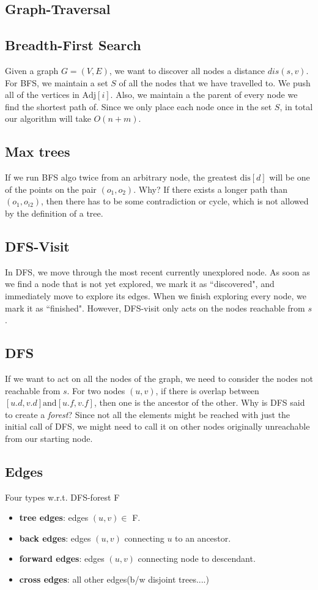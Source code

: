 \documentclass[landscape,4pt,a4paper]{article}
\begin{document}
	\raggedright
	\begin{multicols*}{5}
		\section{Graph-Traversal}
			\subsection{Breadth-First Search}
				Given a graph $G=(V,E)$, we want to discover all nodes a distance $dis(s,v)$.
				For BFS, we maintain a set $S$ of all the nodes that we have travelled to. 
				We push all of the vertices in $\text{Adj}[i]$. Also, we maintain a the parent of 
				every node we find the shortest path of. Since we only place each node once in the set $S$,
				in total our algorithm will take $O(n+m)$.
			\subsection{Max trees}
				If we run BFS algo twice from an arbitrary node, the greatest $\text{dis}[d]$ will be 
				one of the points on the pair $(o_{1},o_{2})$. Why? If there exists a longer 
				path than $(o_{1},o_{i2})$, then there has to be some contradiction or cycle, which is not 
				allowed by the definition of a tree.
			\subsection{DFS-Visit}
				In DFS, we move through the most recent currently unexplored node. As soon as we find a node
				that is not yet explored, we mark it as ``discovered", and immediately move to explore its
				edges. When we finish exploring every node, we mark it as ``finished". However, DFS-visit 
				only acts on the nodes reachable from $s$.
			\subsection{DFS}
				If we want to act on all the nodes of the graph, we need to consider the nodes not reachable 
				from $s$. For two nodes $(u,v)$, if there is overlap between $[u.d,v.d]\text{and}[u.f,v.f]$,
				then one is the ancestor of the other. Why is DFS said to create a \textit{forest}? Since 
				not all the elements might be reached with just the initial call of DFS, we might need to 
				call it on other nodes originally unreachable from our starting node.
			\subsection{Edges}
				Four types w.r.t. DFS-forest F
				\begin{itemize}
					\item{\textbf{tree edges}}: edges $(u,v)\in$ F.
					\item{\textbf{back edges}}: edges $(u,v)$ connecting $u$ to an ancestor.
					\item{\textbf{forward edges}}: edges $(u,v)$ connecting node to descendant.
					\item{\textbf{cross edges}}: all other edges(b/w disjoint trees....)
				\end{itemize}

\end{multicols*}
\end{document}
